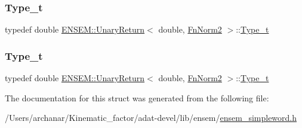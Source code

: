 \mbox{\label{structENSEM_1_1UnaryReturn_3_01double_00_01FnNorm2_01_4_aedc7475de7c195d2c7597fbf10405b87}} 
\subsubsection{\texorpdfstring{Type\_t}{Type\_t}\hspace{0.1cm}{\footnotesize\ttfamily [2/3]}}
{\footnotesize\ttfamily typedef double \mbox{\hyperlink{structENSEM_1_1UnaryReturn}{E\+N\+S\+E\+M\+::\+Unary\+Return}}$<$ double, \mbox{\hyperlink{structENSEM_1_1FnNorm2}{Fn\+Norm2}} $>$\+::\mbox{\hyperlink{structENSEM_1_1UnaryReturn_3_01double_00_01FnNorm2_01_4_aedc7475de7c195d2c7597fbf10405b87}{Type\+\_\+t}}}

\mbox{\label{structENSEM_1_1UnaryReturn_3_01double_00_01FnNorm2_01_4_aedc7475de7c195d2c7597fbf10405b87}} 
\subsubsection{\texorpdfstring{Type\_t}{Type\_t}\hspace{0.1cm}{\footnotesize\ttfamily [3/3]}}
{\footnotesize\ttfamily typedef double \mbox{\hyperlink{structENSEM_1_1UnaryReturn}{E\+N\+S\+E\+M\+::\+Unary\+Return}}$<$ double, \mbox{\hyperlink{structENSEM_1_1FnNorm2}{Fn\+Norm2}} $>$\+::\mbox{\hyperlink{structENSEM_1_1UnaryReturn_3_01double_00_01FnNorm2_01_4_aedc7475de7c195d2c7597fbf10405b87}{Type\+\_\+t}}}



The documentation for this struct was generated from the following file\+:\begin{DoxyCompactItemize}
\item 
/\+Users/archanar/\+Kinematic\+\_\+factor/adat-\/devel/lib/ensem/\mbox{\hyperlink{adat-devel_2lib_2ensem_2ensem__simpleword_8h}{ensem\+\_\+simpleword.\+h}}\end{DoxyCompactItemize}
